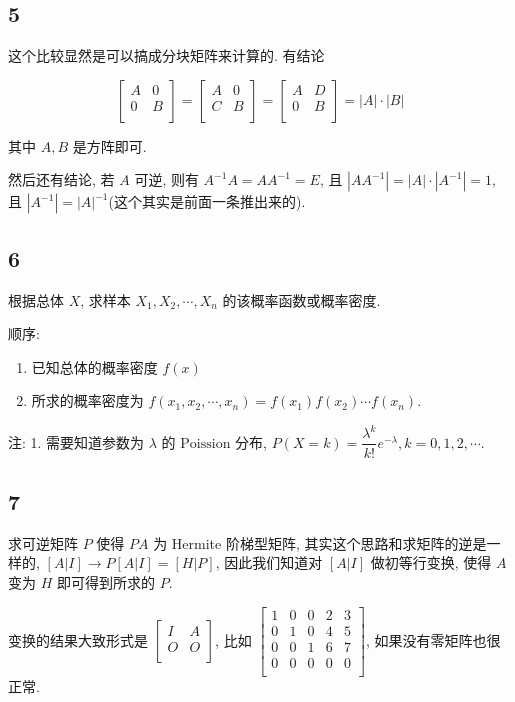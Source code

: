 \documentclass[a4paper, draft]{article}
\begin{document}
\subsection*{5}

这个比较显然是可以搞成分块矩阵来计算的. 有结论

$$
\begin{bmatrix}
    A & 0\\
    0 & B\\
\end{bmatrix}=
\begin{bmatrix}
    A & 0\\
    C & B\\
\end{bmatrix}=
\begin{bmatrix}
    A & D\\
    0 & B\\
\end{bmatrix}=|A|\cdot|B|
$$

其中 $A,B$ 是方阵即可.

然后还有结论, 若 $A$ 可逆, 则有 $A^{-1}A=AA^{-1}=E$, 
且 $|AA^{-1}|=|A|\cdot|A^{-1}|=1$, 
且 $|A^{-1}|=|A|^{-1}$(这个其实是前面一条推出来的).

\subsection*{6}

根据总体 $X$, 求样本 $X_1,X_2,\cdots,X_n$ 的该概率函数或概率密度.

顺序:  

\begin{enumerate}
    \item 已知总体的概率密度 $f(x)$
    \item 所求的概率密度为 $f(x_1,x_2,\cdots,x_n)=f(x_1)f(x_2)\cdots f(x_n)$.
\end{enumerate}

注:  
1. 需要知道参数为 $\lambda$ 的 $\text{Poission}$ 分布, $P(X=k)=\dfrac{\lambda^k}{k!}e^{-\lambda},k=0,1,2,\cdots$.

\subsection*{7}

求可逆矩阵 $P$ 使得 $PA$ 为 Hermite 阶梯型矩阵, 
其实这个思路和求矩阵的逆是一样的, $[A|I]\rightarrow P[A|I]=[H|P]$, 
因此我们知道对 $[A|I]$ 做初等行变换, 使得 $A$ 变为 $H$ 即可得到所求的 $P$.

变换的结果大致形式是 $\begin{bmatrix}
    I&A\\
    O&O\\
\end{bmatrix}$, 比如 $\begin{bmatrix}
    1&0&0&2&3\\
    0&1&0&4&5\\
    0&0&1&6&7\\
    0&0&0&0&0\\
\end{bmatrix}$, 如果没有零矩阵也很正常.
\end{document}
